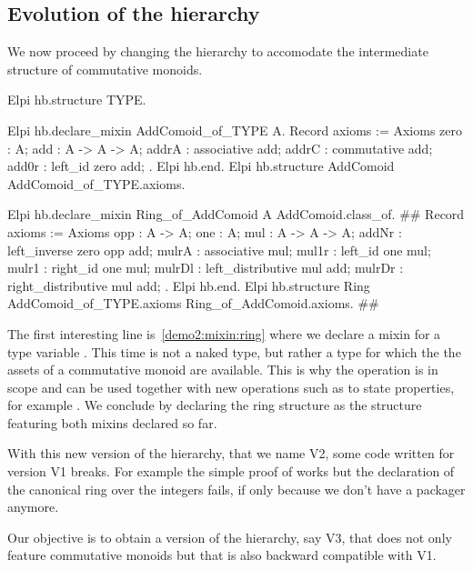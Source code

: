 \documentclass[a4paper,UKenglish,cleveref, autoref]{lipics-v2019}
\begin{document}
\subsection{Evolution of the hierarchy}

We now proceed by changing the hierarchy to accomodate the intermediate
structure  of commutative monoids.

\begin{coqcode}
Elpi hb.structure TYPE.

Elpi hb.declare_mixin AddComoid_of_TYPE A.
  Record axioms := Axioms {
    zero : A;
    add : A -> A -> A;
    addrA : associative add;
    addrC : commutative add;
    add0r : left_id zero add;
  }.
Elpi hb.end.
Elpi hb.structure AddComoid AddComoid_of_TYPE.axioms.

Elpi hb.declare_mixin Ring_of_AddComoid A AddComoid.class_of. #\label{demo2:mixin:ring}#
  Record axioms := Axioms {
    opp : A -> A;
    one : A;
    mul : A -> A -> A;
    addNr : left_inverse zero opp add;
    mulrA : associative mul;
    mul1r : left_id one mul;
    mulr1 : right_id one mul;
    mulrDl : left_distributive mul add;
    mulrDr : right_distributive mul add;
  }.
Elpi hb.end.
Elpi hb.structure Ring AddComoid_of_TYPE.axioms Ring_of_AddComoid.axioms. #\label{demo2:structure:ring}#
\end{coqcode}

The first interesting line is~\ref{demo2:mixin:ring} where we declare a mixin
for a type variable . This time  is not a naked type, but rather
a type for which the the assets of a commutative monoid are available.
This is why the operation  is in scope and can be used
together with new operations such as  to state properties, for
example .
We conclude by declaring the ring structure as the structure featuring both
mixins declared so far.

With this new version of the hierarchy, that we name V2, some code written
for version V1 breaks. For example the simple proof of  works
but the declaration of the canonical ring over the integers fails, if only
because we don't have a  packager anymore.

Our objective is to obtain a version of the hierarchy, say V3, that does
not only feature commutative monoids but that is also backward compatible
with V1.
\end{document}
